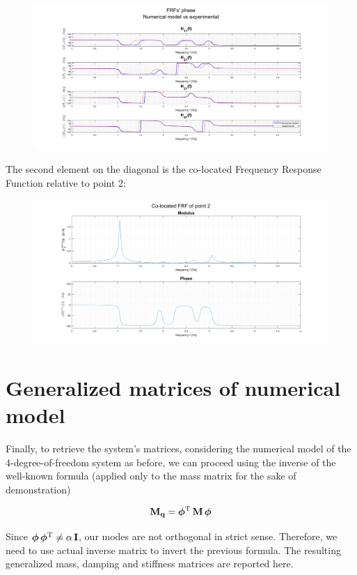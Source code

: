 \documentclass[a4paper,12pt,oneside]{article}
\begin{document}
\begin{figure}[H]
	\hspace{-70pt}
	\includegraphics[scale=0.4]{frfs_num_vs_exp_phase}
\end{figure}

The second element on the diagonal is the co-located Frequency Response Function relative to point 2:

\begin{figure}[H]
	\hspace{-70pt}
	\includegraphics[scale=0.4]{co-located_point2}
\end{figure}


\section{Generalized matrices of numerical model}

Finally, to retrieve the system's matrices, considering the numerical model of the 4-degree-of-freedom system as before, we can proceed using the inverse of the well-known formula (applied only to the mass matrix for the sake of demonstration)

\[
	\mathbf{M_q} = \bm{\phi}^\textup{T} \, \mathbf{M} \, \bm{\phi}
\]

Since $ \bm{\phi} \, \bm{\phi}^\textup{T} \neq \alpha \, \mathbf{I} $, our modes are not orthogonal in strict sense. Therefore, we need to use actual inverse matrix to invert the previous formula. The resulting generalized mass, damping and stiffness matrices are reported here.
\end{document}
